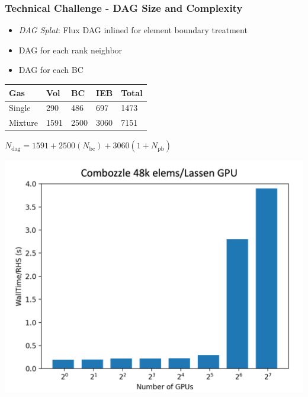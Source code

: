 \begin{frame}\frametitle{Technical Challenge - DAG Size and Complexity}
\vspace{10pt}
\begin{minipage}[t][0.4\textheight][t]{\textwidth}
\begin{multicols}{2}
\begin{itemize}
\item \textit{DAG Splat}: Flux DAG inlined for element boundary treatment
\item DAG for each rank neighbor
\item DAG for each BC
\end{itemize}
\columnbreak
\begin{table}
\centering
\begin{tabularx}{\linewidth}{|X|X|X|X|X|}
\hline
\textbf{Gas} & \textbf{Vol} & \textbf{BC} & \textbf{IEB} & \textbf{Total} \\ \hline
Single & 290 & 486 & 697 & 1473 \\ \hline
Mixture & 1591 & 2500 & 3060 & 7151 \\ \hline
\end{tabularx}
$N_{\text{dag}} = 1591 + 2500(N_{\text{bc}}) + 3060(1 + N_{\text{pb}})$
\end{table}
\end{multicols}
\end{minipage}\vfill
\vspace{-20pt}
\begin{minipage}[t][0.4\textheight][t]{\textwidth}
\centering
\includegraphics[width=.4\textwidth]{Figures/mtc/combozzle_weak_bad_partitioning.png}\hspace{30pt}

\end{minipage}
\end{frame}

